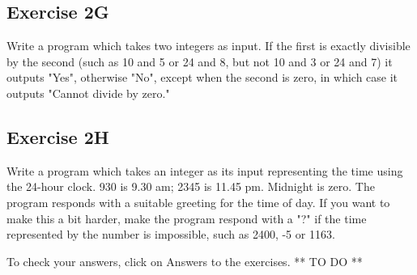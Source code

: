 
\subsection*{Exercise 2G}

Write a program which takes two integers as input.
If the first is exactly divisible
by the second (such as 10 and 5 or 24 and 8, but not 10 and 3 or 24 and 7)
it outputs "Yes", otherwise "No", except when the second
is zero, in which case it outputs "Cannot divide by zero."

\subsection*{Exercise 2H}

Write a program which takes an integer as its input representing the time
using the 24-hour clock.  930 is 9.30 am; 2345 is 11.45 pm.  Midnight is
zero.  The program responds with a suitable greeting for the time of day.
If you want to make this a bit harder, make the program respond with a "?"
if the time represented by the number is impossible, such as 2400, -5 or
1163.

To check your answers, click on Answers to the exercises. ** TO DO **


